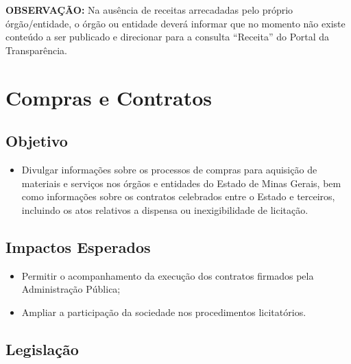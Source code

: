 \documentclass[]{book}
\providecommand{\tightlist}{%
  \setlength{\itemsep}{0pt}\setlength{\parskip}{0pt}}
\begin{document}
\textbf{OBSERVAÇÃO:} Na ausência de receitas arrecadadas pelo próprio órgão/entidade, o órgão ou entidade deverá informar que no momento não existe conteúdo a ser publicado e direcionar para a consulta ``Receita'' do Portal da Transparência.

\hypertarget{compras-e-contratos}{%
\section{Compras e Contratos}\label{compras-e-contratos}}

\hypertarget{objetivo-5}{%
\subsection{Objetivo}\label{objetivo-5}}

\begin{itemize}
\tightlist
\item
  Divulgar informações sobre os processos de compras para aquisição de materiais e serviços nos órgãos e entidades do Estado de Minas Gerais, bem como informações sobre os contratos celebrados entre o Estado e terceiros, incluindo os atos relativos a dispensa ou inexigibilidade de licitação.
\end{itemize}

\hypertarget{impactos-esperados-6}{%
\subsection{Impactos Esperados}\label{impactos-esperados-6}}

\begin{itemize}
\tightlist
\item
  Permitir o acompanhamento da execução dos contratos firmados pela Administração Pública;
\item
  Ampliar a participação da sociedade nos procedimentos licitatórios.
\end{itemize}

\hypertarget{legislauxe7uxe3o-6}{%
\subsection{Legislação}\label{legislauxe7uxe3o-6}}
\end{document}
